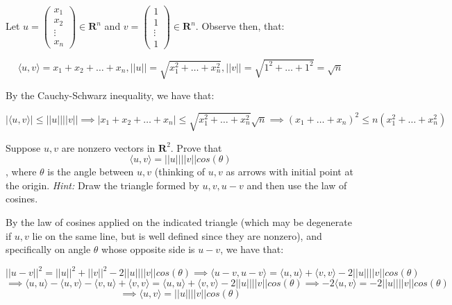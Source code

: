 \begin{solution}

Let $u = \begin{pmatrix} x_1 \\ x_2 \\ \vdots \\ x_n \end{pmatrix} \in \mathbf{R}^n$ and $v = \begin{pmatrix} 1 \\ 1 \\ \vdots \\ 1 \end{pmatrix} \in \mathbf{R}^n$. Observe then, that:

$$\langle u, v \rangle = x_1 + x_2 + \ldots + x_n, \lvert \lvert u \rvert \rvert = \sqrt{x_1^2 + \ldots + x_n^2}, \lvert \lvert v \rvert \rvert = \sqrt{1^2 + \ldots + 1^2} = \sqrt{n}$$

By the Cauchy-Schwarz inequality, we have that:

$$ \lvert \langle u, v \rangle \rvert \leq \lvert \lvert u \rvert \rvert \lvert \lvert v \rvert \rvert \implies \lvert x_1 + x_2 + \ldots + x_n \rvert \leq \sqrt{x_1^2 + \ldots + x_n^2}\sqrt{n} \implies (x_1 + \ldots + x_n)^2 \leq n(x_1^2 + \ldots + x_n^2)$$

\end{solution}

\begin{exercise}{13}
Suppose $u, v$ are nonzero vectors in $\mathbf{R}^2$. Prove that 
$$\langle u, v \rangle = \lvert \lvert u \rvert \rvert \lvert \lvert v \rvert \rvert cos(\theta)$$, 
where $\theta$ is the angle between $u, v$ (thinking of $u, v$ as arrows with initial point at the origin.
\textit{Hint:} Draw the triangle formed by $u, v, u - v$ and then use the law of cosines.
\end{exercise}

\begin{solution}

By the law of cosines applied on the indicated triangle (which may be degenerate if $u, v$ lie on the same line, but is well defined since they are nonzero), and specifically on angle $\theta$ whose opposite side is $u - v$, we have that:

$$\lvert \lvert u - v \rvert \rvert ^2 = \lvert \lvert u \rvert \rvert ^2 + \lvert \lvert v \rvert \rvert ^2 - 2\lvert \lvert u \rvert \rvert \lvert \lvert v \rvert \rvert cos(\theta) \implies \langle u - v, u -v \rangle = \langle u, u \rangle + \langle v, v \rangle - 2\lvert \lvert u \rvert \rvert \lvert \lvert v \rvert \rvert cos(\theta)$$
$$\implies \langle u, u \rangle - \langle u, v \rangle - \langle v, u \rangle + \langle v, v \rangle = \langle u, u \rangle + \langle v, v \rangle - 2\lvert \lvert u \rvert \rvert \lvert \lvert v \rvert \rvert cos(\theta) \implies -2 \langle u, v \rangle = -2 \lvert \lvert u \rvert \rvert \lvert \lvert v \rvert \rvert cos(\theta)$$
$$\implies \langle u, v \rangle = \lvert \lvert u \rvert \rvert \lvert \lvert v \rvert \rvert cos(\theta)$$

\end{solution}


